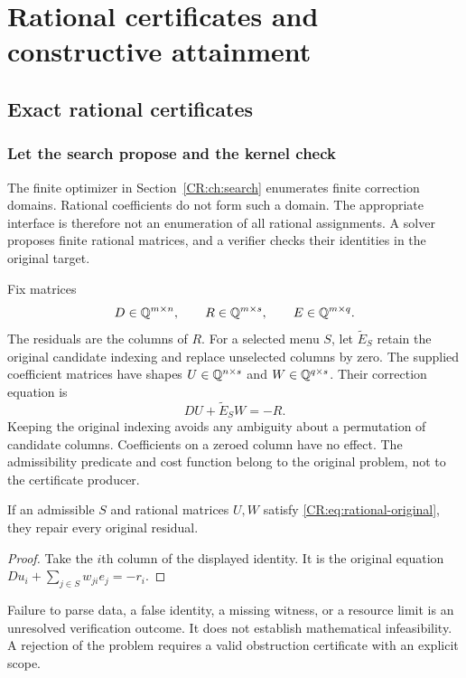\chapter{Rational certificates and constructive attainment}\label{CR:book:chapter-57}
\section{Exact rational certificates}\label{CR:cr-source-section-8}\label{CR:ch:rational}
\subsection{Let the search propose and the kernel check}
The finite optimizer in Section~\ref{CR:ch:search} enumerates finite correction domains. Rational coefficients do not form such a domain. The appropriate interface is therefore not an enumeration of all rational assignments. A solver proposes finite rational matrices, and a verifier checks their identities in the original target.

Fix matrices
\[
 D\in\mathbb{Q}^{m\times n},\qquad R\in\mathbb{Q}^{m\times s},\qquad E\in\mathbb{Q}^{m\times q}.
\]
The residuals are the columns of $R$. For a selected menu $S$, let $\widetilde E_S$ retain the original candidate indexing and replace unselected columns by zero. The supplied coefficient matrices have shapes $U\in\mathbb{Q}^{n\times s}$ and $W\in\mathbb{Q}^{q\times s}$. Their correction equation is
\begin{equation}\label{CR:eq:rational-original}
 DU+\widetilde E_SW=-R.
\end{equation}
Keeping the original indexing avoids any ambiguity about a permutation of candidate columns. Coefficients on a zeroed column have no effect. The admissibility predicate and cost function belong to the original problem, not to the certificate producer.

\begin{CRproposition}\label{CR:prop:rational-success}
If an admissible $S$ and rational matrices $U,W$ satisfy \eqref{CR:eq:rational-original}, they repair every original residual.
\end{CRproposition}
\begin{proof}
Take the $i$th column of the displayed identity. It is the original equation $Du_i+\sum_{j\in S}w_{ji}e_j=-r_i$.
\end{proof}

\begin{scopebox}[title=A rejected certificate is not a rejected problem]
Failure to parse data, a false identity, a missing witness, or a resource limit is an unresolved verification outcome. It does not establish mathematical infeasibility. A rejection of the problem requires a valid obstruction certificate with an explicit scope.
\end{scopebox}

